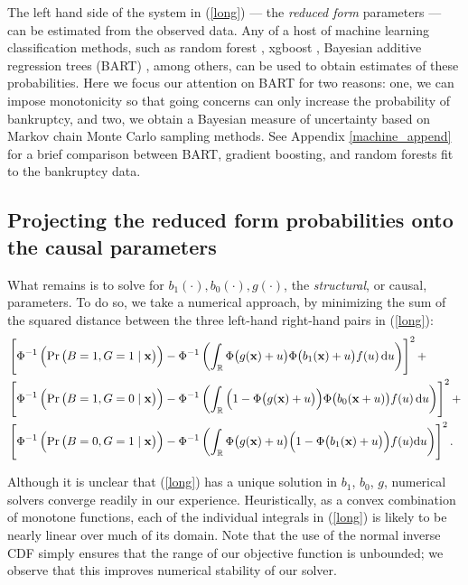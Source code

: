 \documentclass[aoas,preprint, 11pt, dvipsnames, table, x11name]{imsart}
\renewcommand{\bm}[1]{\mathbf{#1}}
\theoremstyle{remark}
\begin{document}
The left hand side of the system in (\ref{long}) --- the {\em reduced form} parameters --- can be estimated from the observed data.  Any of a host of machine learning classification methods, such as random forest \citep{rf}, xgboost \citep{boost}, Bayesian additive regression trees (BART) \citep{bart}, among others, can be used to obtain estimates of these probabilities. Here we focus our attention on BART for two reasons: one, we can impose monotonicity so that going concerns can only increase the probability of bankruptcy, and two, we obtain a Bayesian measure of uncertainty based on Markov chain Monte Carlo sampling methods. See Appendix \ref{machine_append} for a brief comparison between BART, gradient boosting, and random forests fit to the bankruptcy data.



\subsection{Projecting the reduced form probabilities onto the causal parameters}
What remains is to solve for $b_1(\cdot),b_0(\cdot), g(\cdot)$, the {\em structural}, or causal, parameters. To do so, we take a numerical approach, by minimizing  the sum of the squared distance between the three left-hand right-hand pairs in (\ref{long}):
\begin{align*}
&\left[\Phi^{-1}\left(\Pr\qty(B=1, G=1\mid \mathbf{x})\right)-\Phi^{-1}\left(\int_{\mathbb{R}} \Phi\qty(g(\mathbf{x})+u)\Phi\qty(b_1(\mathbf{x})+u)f(u)\dd{u}\right)\right]^2+\\
&\left[\Phi^{-1}\left(\Pr\qty(B=1, G=0\mid \mathbf{x})\right)-\Phi^{-1}\left(\int_{\mathbb{R}} \qty(1-\Phi\qty(g(\bm{x})+u))\Phi\qty(b_0(\bm{x}+u))f(u)\dd{u}\right)\right]^2+\\
&\left[\Phi^{-1}\left(\Pr\qty(B=0, G=1\mid \mathbf{x})\right)-\Phi^{-1}\left(\int_{\mathbb{R}}\Phi\qty(g(\bm{x})+u)\qty(1-\Phi\qty(b_1(\bm{x})+u))f(u)\dd u\right)\right]^2.
\end{align*}

Although it is unclear that (\ref{long}) has a unique solution in $b_1$, $b_0$, $g$, numerical solvers converge readily in our experience. Heuristically, as a convex combination of monotone functions, each of the individual integrals in (\ref{long}) is likely to be nearly linear over much of its domain. Note that the use of the normal inverse CDF simply ensures that the range of our objective function is unbounded; we observe that this improves numerical stability of our solver.
\end{document}
